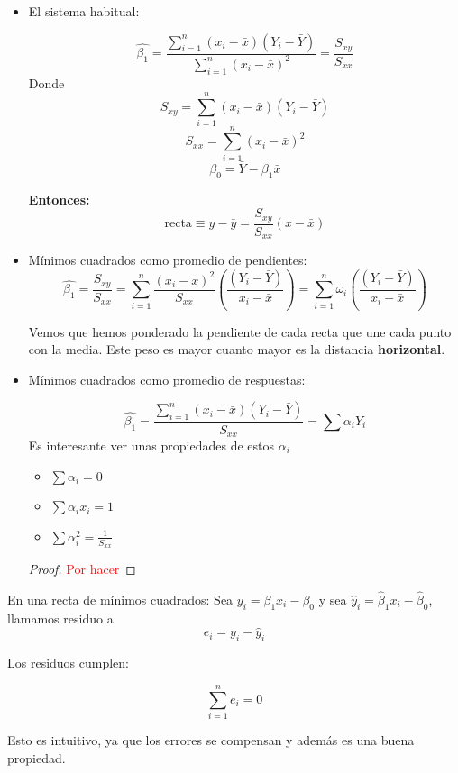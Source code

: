 \begin{itemize}

	\item El sistema habitual:

	\[ \hat{β_1} = \frac{\sum_{i=1}^n(x_i - \bar{x})(Y_i - \bar{Y})}{\sum_{i=1}^n (x_i - \bar{x})^2} = \frac{S_{xy}}{S_{xx}} \]
	Donde 
		\[S_{xy} = \sum_{i=1}^n(x_i - \bar{x})(Y_i - \bar{Y}) \] 
		\label{Ssubxx}
		\[S_{xx} = \sum_{i=1}^n (x_i - \bar{x})^2\]
	\subitem \[β_0 = \bar{Y} - β_1\bar{x}\]

	\textbf{Entonces:}
	\[\text{recta} \equiv y - \bar{y} = \frac{S_{xy}}{S_{xx}}(x - \bar{x} ) \]

	\item Mínimos cuadrados como promedio de pendientes:
	\label{rmc::promediopendientes}
	\[
	\hat{β_1} = \frac{S_{xy}}{S_{xx}} = \sum_{i=1}^n \frac{(x_i - \bar{x})^2}{S_{xx}} \left( \frac{(Y_i - \bar{Y})}{x_i - \bar{x}} \right) = \sum_{i=1}^n ω_i \left( \frac{(Y_i - \bar{Y})}{x_i - \bar{x}} \right)
	\]

	Vemos que hemos ponderado la pendiente de cada recta que une cada punto con la media. Este peso es mayor cuanto mayor es la distancia \textbf{horizontal}. 

	\item Mínimos cuadrados como promedio de respuestas:

	\[
	\hat{β_1} = \frac{\sum_{i=1}^n  (x_i - \bar{x}) (Y_i - \bar{Y})}{S_{xx}} = \sum α_i Y_i
	\]
	Es interesante ver unas propiedades de estos $α_i$
	\begin{prop}


		\begin{itemize}
			\item[] $\sum α_i = 0$
			\item[] $\sum α_ix_i = 1$
			\item[] $\sum α_i^2 = \frac{1}{S_{xx}}$
		\end{itemize}

	\end{prop}
	\begin{proof}
	\textcolor{red}{Por hacer}
	\end{proof}

\end{itemize}


\begin{defn}[Residuo]
En una recta de mínimos cuadrados: Sea $y_i = β_1x_i - β_0$ y sea $\hat{y}_i = \hat{β}_1x_i - \hat{β}_0$, llamamos residuo a $$e_i = y_i - \hat{y}_i$$

Los residuos cumplen:

\[
\sum_{i=1}^n e_i = 0
\]

Esto es intuitivo, ya que los errores se compensan y además es una buena propiedad.
\end{defn}




